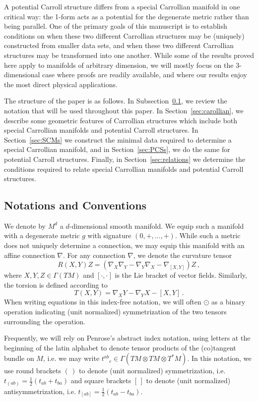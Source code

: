\documentclass{article}
\theoremstyle{definition}
\theoremstyle{remark}
\begin{document}
A potential Carroll structure differs from a special Carrollian manifold in one critical way: the 1-form acts as a potential for the degenerate metric rather than being parallel. One of the primary goals of this manuscript is to establish conditions on when these two different Carrollian structures may be (uniquely) constructed from smaller data sets, and when these two different Carrollian structures may be transformed into one another. While some of the results proved here apply to manifolds of arbitrary dimension,  we will mostly focus on the 3-dimensional case where proofs are readily available, and where our results enjoy the most direct physical applications.

The structure of the paper is as follows. In Subsection~\ref{sec:notations}, we review the notation that will be used throughout this paper. In Section~\ref{sec:carollian}, we describe some geometric features of Carrollian structures which include both special Carrollian manifolds and potential Carroll structures. In Section~\ref{sec:SCMs} we construct the minimal data required to determine a special Carrollian manifold, and in Section~\ref{sec:PCSs}, we do the same for potential Carroll structures. Finally, in Section~\ref{sec:relations} we determine the conditions required to relate special Carrollian manifolds and potential Carroll structures.

\subsection{Notations and Conventions} \label{sec:notations}
We denote by $M^d$ a $d$-dimensional smooth manifold. We equip such a manifold with a degenerate metric $g$ with signature $(0, +, \ldots, +)$. While such a metric does not uniquely determine a connection, we may equip this manifold with an affine connection $\nabla$. For any connection $\nabla$, we denote the curvature tensor
$$R(X,Y)Z = (\nabla_X \nabla_Y - \nabla_Y \nabla_X - \nabla_{[X,Y]})Z\,,$$
where $X,Y,Z \in \Gamma(TM)$ and $[\cdot, \cdot]$ is the Lie bracket of vector fields. Similarly, the torsion is defined according to
$$T(X,Y) = \nabla_X Y - \nabla_Y X - [X,Y]\,.$$
When writing equations in this index-free notation, we will often $\odot$ as a binary operation indicating (unit normalized) symmetrization of the two tensors surrounding the operation.

Frequently, we will rely on Penrose's abstract index notation, using letters at the beginning of the latin alphabet to denote tensor products of the (co)tangent bundle on $M$, i.e. we may write $t^{ab}{}_{c} \in \Gamma(TM \otimes TM \otimes T^*M)$. In this notation, we use round brackets $(\,)$ to denote (unit normalized) symmetrization, i.e. $t_{(ab)} = \tfrac{1}{2}(t_{ab} + t_{ba})$ and square brackets $[\, ]$ to denote (unit normalized) antisymmetrization, i.e. $t_{[ab]} = \tfrac{1}{2}(t_{ab} - t_{ba})$. 
\end{document}
